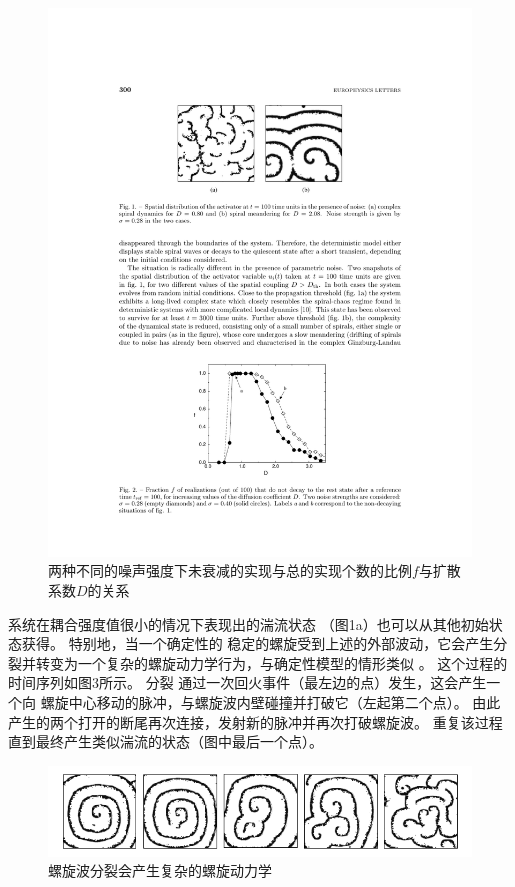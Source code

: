 \documentclass[
bachelor,
nofont, %
pdflinks,
]{xjtuthesis}
\begin{document}
\begin{figure}[!ht]
\centering
\includegraphics[scale=1]{fig2.pdf}
\caption{两种不同的噪声强度下未衰减的实现与总的实现个数的比例$f$与扩散系数$D$的关系}
\end{figure}

\medskip
系统在耦合强度值很⼩的情况下表现出的湍流状态
（图1a）也可以从其他初始状态获得。 特别地，当⼀个确定性的
稳定的螺旋受到上述的外部波动，它会产生分裂并转变为一个复杂的螺旋动⼒学行为，与确定性模型的情形类似
。 这个过程的时间序列如图3所⽰。 分裂
通过一次回⽕事件（最左边的点）发⽣，这会产⽣⼀个向
螺旋中⼼移动的脉冲，与螺旋波内壁碰撞并打破它（左起第⼆个点）。 由此产生的两个打开的断尾再次连接，发射新的脉冲并再次打破螺旋波。
重复该过程直到最终产⽣类似湍流的状态（图中最后⼀个点）。

\begin{figure}[!ht]
\centering
\includegraphics[scale=0.68]{fig3.png}
\caption{螺旋波分裂会产生复杂的螺旋动力学}
\end{figure}
\end{document}
